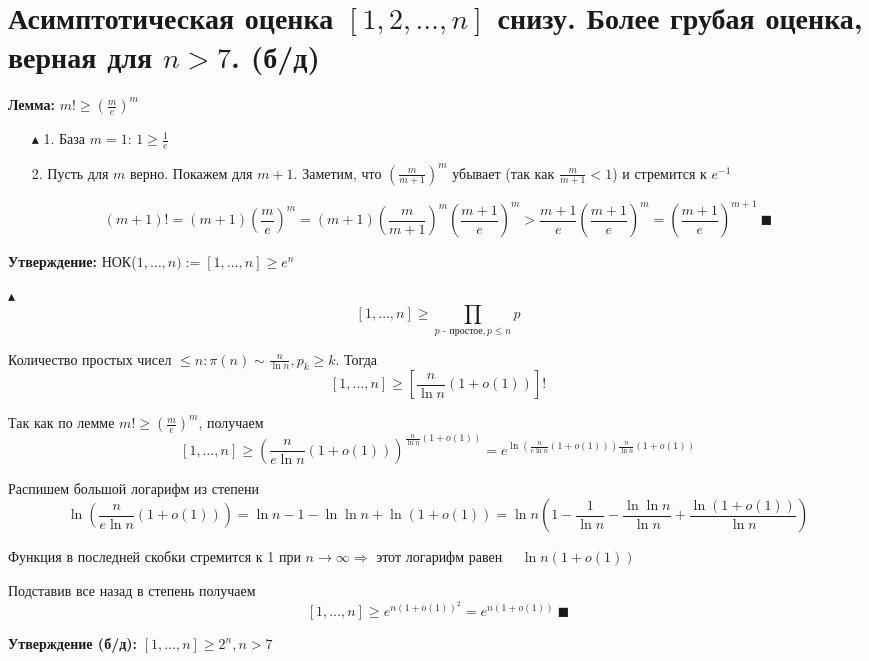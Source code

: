\setcounter{section}{81}
\section{Асимптотическая оценка \texorpdfstring{$[1, 2, \ldots , n]$}{[1, 2, ..., n]} снизу. Более грубая оценка, верная для $n > 7$. (б/д)}
\par \textbf{Лемма:} $m! \geq \left( \frac{m}{e}\right)^m$
\par \begin{itemize}
    \item[$\blacktriangle$ 1.] База $m=1$: $1 \geq \frac{1}{e}$
    \item[2.] Пусть для $m$ верно. Покажем для $m+1$. Заметим, что $\left(\frac{m}{m+1}\right)^m$ убывает (так как $\frac{m}{m+1}<1$) и стремится к $e^{-1}$
\end{itemize}
$$(m+1)!=(m+1)\left(\frac{m}{e}\right)^m =(m+1) \left(\frac{m}{m+1}\right)^m \left(\frac{m+1}{e}\right)^m>\frac{m+1}{e}\left(\frac{m+1}{e}\right)^m=\left(\frac{m+1}{e}\right)^{m+1} \: \blacksquare$$
\par \textbf{Утверждение:} НОК($1, \ldots, n):=[1, \ldots, n]\geq e^n$
\par $\blacktriangle$ $$[1, \ldots, n] \geq \prod_{p\text{ - простое}, p\leq n} p$$
\par Количество простых чисел $\leq n: \pi(n) \sim \frac{n}{\ln{n}}, p_k \geq k$. Тогда
$$[1, \ldots, n] \geq \left[\frac{n}{\ln{n}}(1+o(1))\right]!$$
\par Так как по лемме $m! \geq \left(\frac{m}{e}\right)^m$, получаем
$$[1, \ldots, n] \geq \left(\frac{n}{e\ln{n}}(1+o(1))\right)^{\frac{n}{\ln{n}}(1+o(1))}=e^{\ln{\left(\frac{n}{e\ln{n}}(1+o(1))\right)}\frac{n}{\ln{n}}(1+o(1))}$$
\par Распишем большой логарифм из степени
$$\ln{\left(\frac{n}{e\ln{n}}(1+o(1))\right)}=\ln{n}-1-\ln{\ln{n}}+\ln{(1+o(1))}=\ln{n}\left(1-\frac{1}{\ln{n}}-\frac{\ln{\ln{n}}}{\ln{n}}+\frac{\ln{(1+o(1))}}{\ln{n}}\right)$$
\par Функция в последней скобки стремится к 1 при $n \rightarrow \infty \Rightarrow$ этот логарифм равен $\quad \ln{n}(1+o(1))$
\par Подставив все назад в степень получаем
$$[1, \ldots, n] \geq e^{n(1+o(1))^2}=e^{n(1+o(1))} \: \blacksquare$$
\par \textbf{Утверждение (б/д):} $[1, \ldots, n]\geq 2^n, n>7$